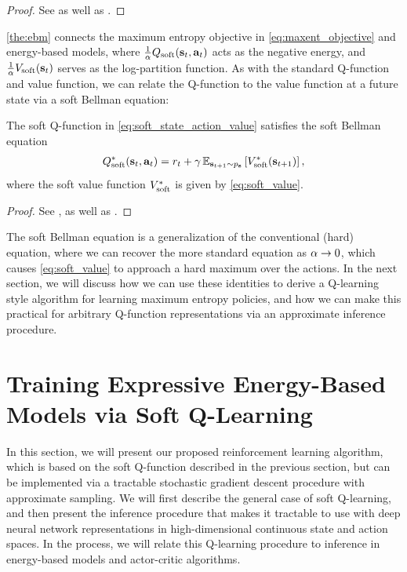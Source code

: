 \documentclass{article}
\begin{document}
\begin{proof}
\vspace{-2mm}
See  as well as \cite{ziebart2010modeling}.
\end{proof}
\vspace{-2mm}
\autoref{the:ebm} connects the maximum entropy objective in \autoref{eq:maxent_objective} and energy-based models, where $\frac{1}{\alpha}Q_\mathrm{soft}({\mathbf{s}_t}, {\mathbf{a}_t})$ acts as the negative energy, and $\frac{1}{\alpha}V_\mathrm{soft}({\mathbf{s}_t})$ serves as the log-partition function.
As with the standard Q-function and value function, we can relate the Q-function to the value function at a future state via a soft Bellman equation:
\begin{theorem}
\label{the:soft_bellman}
The soft Q-function in \autoref{eq:soft_state_action_value} satisfies the soft Bellman equation 
\begin{align}
Q_\mathrm{soft}^*({\mathbf{s}_t}, {\mathbf{a}_t}) = r_t + \gamma\operatorname{\mathbb{E}}_{{\mathbf{s}_{t+1}}\sim p_{\mathbf{s}}}\left[V_\mathrm{soft}^*({\mathbf{s}_{t+1}})\right],
\label{eq:soft_bellman}
\end{align}
where the soft value function $V_\mathrm{soft}^*$ is given by \autoref{eq:soft_value}.
\end{theorem}
\begin{proof}
\vspace{-3mm}
See , as well as  \cite{ziebart2010modeling}.
\end{proof}
\vspace{-3mm}
The soft Bellman equation is a generalization of the conventional (hard) equation, where we can recover the more standard equation as $\alpha \rightarrow 0$, which causes \autoref{eq:soft_value} to approach a hard maximum over the actions. In the next section, we will discuss how we can use these identities to derive a Q-learning style algorithm for learning maximum entropy policies, and how we can make this practical for arbitrary Q-function representations via an approximate inference procedure.




\vspace{-2mm}
\section{Training Expressive Energy-Based Models via Soft Q-Learning}
\label{sec:training}
\vspace{-1mm}
In this section, we will present our proposed reinforcement learning algorithm, which is based on the soft Q-function described in the previous section, but can be implemented via a tractable stochastic gradient descent procedure with approximate sampling. We will first describe the general case of soft Q-learning, and then present the inference procedure that makes it tractable to use with deep neural network representations in high-dimensional continuous state and action spaces. In the process, we will relate this Q-learning procedure to inference in energy-based models and actor-critic algorithms.
\end{document}
